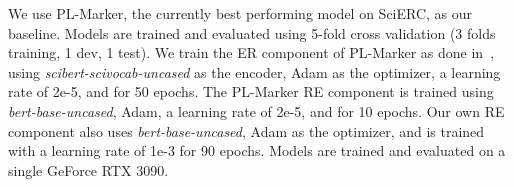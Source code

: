 We use PL-Marker, the currently best performing model on SciERC, as our baseline.
Models are trained and evaluated using 5-fold cross validation (3 folds training, 1 dev, 1 test).
%
%
We train the ER component of PL-Marker as done in~\cite{Ye2022}, using \textit{scibert-scivocab-uncased} as the encoder, Adam as the optimizer, a learning rate of 2e-5, and for 50 epochs. The PL-Marker RE component is trained using \textit{bert-base-uncased}, Adam, a learning rate of 2e-5, and for 10 epochs. Our own RE component also uses \textit{bert-base-uncased}, Adam as the optimizer, and is trained with a learning rate of 1e-3 for 90 epochs.
Models are trained and evaluated on a single GeForce RTX 3090. %




